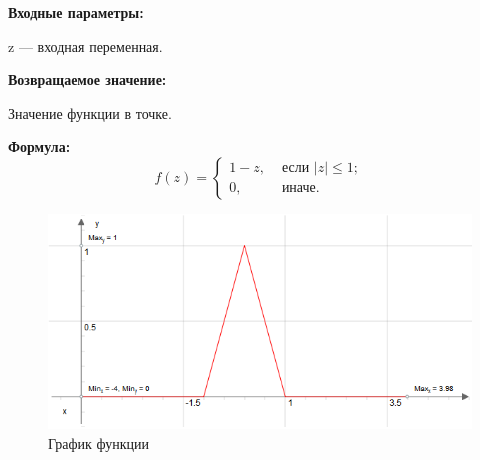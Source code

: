 \textbf{Входные параметры:}
 
z --- входная переменная.

\textbf{Возвращаемое значение:}
 
Значение функции в точке.

\textbf{Формула:}
\begin{equation*}
f\left(z \right)=\left\lbrace \begin{aligned} 1-z,& \text{ если } \left| z\right| \leq 1 ; \\ 0,& \text{ иначе}. \end{aligned}\right.
\end{equation*}

 \begin{figure} [h] 
   \center
   \includegraphics {MHL_BellShapedKernelTriangle_Graph.png}
   \caption{График функции} 
   \label{img:MHL_BellShapedKernelTriangle_Graph}  
 \end{figure}